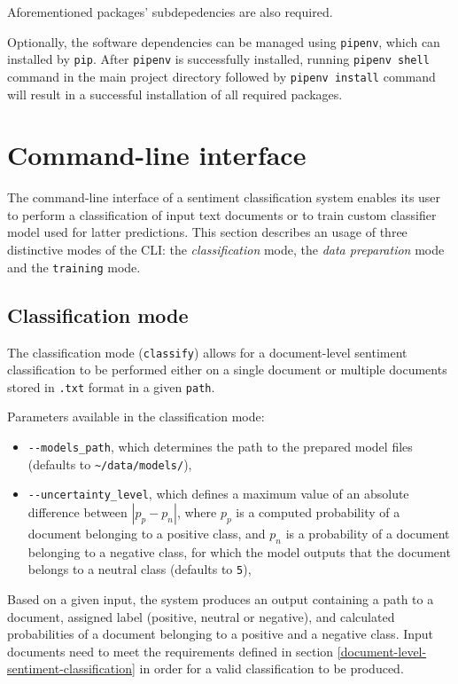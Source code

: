 Aforementioned packages' subdepedencies are also required.

Optionally, the software dependencies can be managed using \lstinline{pipenv}, which can installed by \lstinline{pip}. After \lstinline{pipenv} is successfully installed, running \lstinline{pipenv shell} command in the main project directory followed by \lstinline{pipenv install} command will result in a successful installation of all required packages.  

\section{Command-line interface}

The command-line interface of a sentiment classification system enables its user to perform a classification of input text documents or to train custom classifier model used for latter predictions. This section describes an usage of three distinctive modes of the CLI: the \emph{classification} mode, the \emph{data preparation} mode and the \lstinline{training} mode.

\subsection{Classification mode}

The classification mode (\lstinline{classify}) allows for a document-level sentiment classification to be performed either on a single document or multiple documents stored in \lstinline{.txt} format in a given \lstinline{path}.

Parameters available in the classification mode:

\begin{itemize}
    \item \lstinline{--models_path}, which determines the path to the prepared model files (defaults to \lstinline{~/data/models/}),
    \item \lstinline{--uncertainty_level}, which defines a maximum value of an absolute difference between $|p_p - p_n|$, where $p_p$ is a computed probability of a document belonging to a positive class, and $p_n$ is a probability of a document belonging to a negative class, for which the model outputs that the document belongs to a neutral class (defaults to \lstinline{5}),
\end{itemize}

Based on a given input, the system produces an output containing a path to a document, assigned label (positive, neutral or negative), and calculated probabilities of a document belonging to a positive and a negative class. Input documents need to meet the requirements defined in section \ref{document-level-sentiment-classification} in order for a valid classification to be produced.

